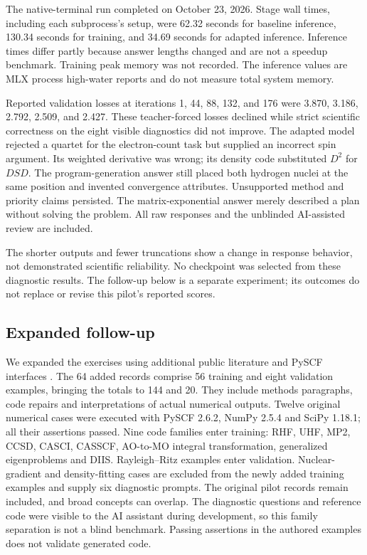\documentclass[11pt]{article}
\begin{document}
The native-terminal run completed on October 23, 2026. Stage wall times,
including each subprocess's setup, were 62.32 seconds for baseline inference,
130.34 seconds for training, and 34.69 seconds for adapted inference. Inference
times differ partly because answer lengths changed and are not a speedup
benchmark. Training peak memory was not recorded. The inference values are
MLX process high-water reports and do not measure total system memory.

Reported validation losses at iterations 1, 44, 88, 132, and 176 were 3.870,
3.186, 2.792, 2.509, and 2.427. These teacher-forced losses declined while
strict scientific correctness on the eight visible diagnostics did not
improve. The adapted model rejected a quartet for the electron-count task
but supplied an incorrect spin argument. Its weighted derivative was wrong;
its density code substituted $D^2$ for $DSD$. The program-generation answer
still placed both hydrogen nuclei at the same position and invented
convergence attributes. Unsupported method and priority claims persisted.
The matrix-exponential answer merely described a plan without solving the
problem. All raw responses and the unblinded AI-assisted review are included.

The shorter outputs and fewer truncations show a change in response behavior,
not demonstrated scientific reliability. No checkpoint was selected from
these diagnostic results. The follow-up below is a separate experiment;
its outcomes do not replace or revise this pilot's reported scores.

\subsection{Expanded follow-up}
We expanded the exercises using additional public literature and PySCF
interfaces \cite{pyscf2020}. The 64 added records comprise 56 training and
eight validation examples, bringing the totals to 144 and 20. They include
methods paragraphs, code repairs and interpretations of actual numerical
outputs. Twelve original numerical cases were executed with PySCF 2.6.2,
NumPy 2.5.4 and SciPy 1.18.1; all their assertions passed. Nine code families
enter training: RHF, UHF, MP2, CCSD, CASCI, CASSCF, AO-to-MO integral
transformation, generalized eigenproblems and DIIS. Rayleigh--Ritz examples
enter validation. Nuclear-gradient and density-fitting cases are excluded
from the newly added training examples and supply six diagnostic prompts.
The original pilot records remain included, and broad concepts can overlap.
The diagnostic questions and reference code were visible to the AI assistant
during development, so this family separation is not a blind benchmark.
Passing assertions in the authored examples does not validate generated code.
\end{document}
